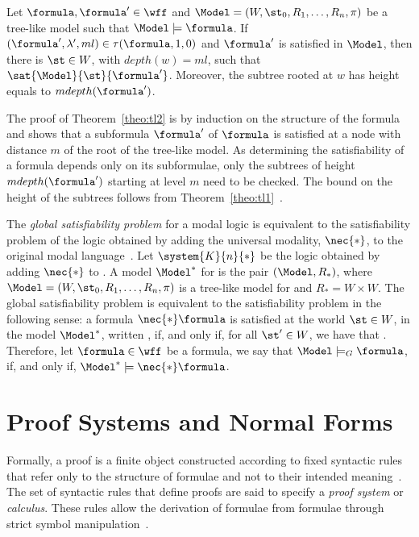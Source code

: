 \begin{example}
    \begin{theorem}
        \label{theo:tl2}
        Let $\formula, \formula' \in \wff$ and $\Model = (W, \st_0, R_1, \ldots,
        R_n, \pi)$ be a tree-like model such that $\Model \models \formula$. If
        $(\formula', \lambda', ml) \in \tau(\formula, 1, 0)$ and
        $\formula'$ is satisfied in $\Model$, then there is $\st \in W$, with
        $depth(w) = ml$, such that $\sat{\Model}{\st}{\formula'}$. Moreover,
        the subtree rooted at $w$ has height equals to $mdepth(\formula')$.
    \end{theorem}

    The proof of Theorem~\ref{theo:tl2} is by induction on the structure of the
    formula and shows that a subformula $\formula'$ of $\formula$ is satisfied
    at a node with distance $m$ of the root of the tree-like model. As
    determining the satisfiability of a formula depends only on its subformulae,
    only the subtrees of height $mdepth(\formula')$ starting at level $m$ need
    to be checked. The bound on the height of the subtrees follows from
    Theorem~\ref{theo:tl1}~\cite{nalon2015modal}.
\end{example}

The \emph{global satisfiability problem} for a modal logic is equivalent to the
satisfiability problem of the logic obtained by adding the
universal modality, $\nec{*}$, to the original modal
language~\cite{goranko1992using}. Let $\system{K}{n}{*}$ be the logic obtained
by adding $\nec{*}$ to . A model $\Model^*$ for 
is the pair $(\Model, R_*)$, where $\Model = (W, \st_0, R_1, \ldots, R_n, \pi)$
is a tree-like model for  and $R_* = W \times W$. The global
satisfiability problem is equivalent to the satisfiability problem in the
following sense: a formula $\nec{*} \formula$ is satisfied at the world $\st \in
W$, in the model $\Model^*$, written \sat{\Model^*}{\st}{\nec{*}\formula}, if,
and only if, for all $\st' \in W$, we have that .
Therefore, let $\formula \in \wff$ be a formula, we say that $\Model \models_G
\formula$, if, and only if, $\Model^* \models \nec{*} \formula$.

\section{Proof Systems and Normal Forms}

Formally, a proof is a finite object constructed according
to fixed syntactic rules that refer only to the structure of formulae and not to
their intended meaning~\cite{fitting}. The set of syntactic rules that define
proofs are said to specify a \emph{proof system} or \emph{calculus}. These rules
allow the derivation of formulae from formulae through strict symbol
manipulation~\cite{resolutionbased}.

